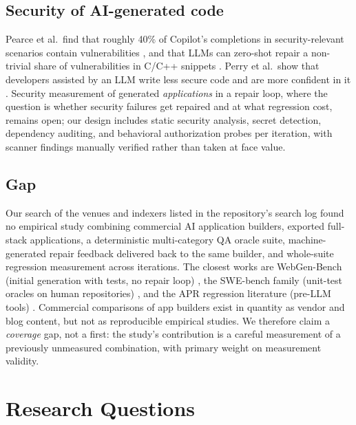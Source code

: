 \subsection{Security of AI-generated code}

Pearce et al.\ find that roughly 40\% of Copilot's completions in security-relevant
scenarios contain vulnerabilities \cite{pearce2022asleep}, and that LLMs can zero-shot
repair a non-trivial share of vulnerabilities in C/C++ snippets
\cite{pearce2023zeroshot}. Perry et al.\ show that developers assisted by an LLM write
less secure code and are more confident in it \cite{perry2023insecure}. Security
measurement of generated \emph{applications} in a repair loop, where the question is
whether security failures get repaired and at what regression cost, remains open; our
design includes static security analysis, secret detection, dependency auditing, and
behavioral authorization probes per iteration, with scanner findings manually
verified rather than taken at face value.

\subsection{Gap}

Our search of the venues and indexers listed in the repository's search log found no
empirical study combining commercial AI application builders, exported full-stack
applications, a deterministic multi-category QA oracle suite, machine-generated
repair feedback delivered back to the same builder, and whole-suite regression
measurement across iterations. The closest works are WebGen-Bench (initial
generation with tests, no repair loop) \cite{lu2025webgen}, the SWE-bench family
(unit-test oracles on human repositories) \cite{jimenez2024swebench}, and the APR
regression literature (pre-LLM tools) \cite{lou2024apr,ismayilzada2023poracle}.
Commercial comparisons of app builders exist in quantity as vendor and blog content,
but not as reproducible empirical studies. We therefore claim a \emph{coverage} gap,
not a first: the study's contribution is a careful measurement of a previously
unmeasured combination, with primary weight on measurement validity.

\section{Research Questions}

